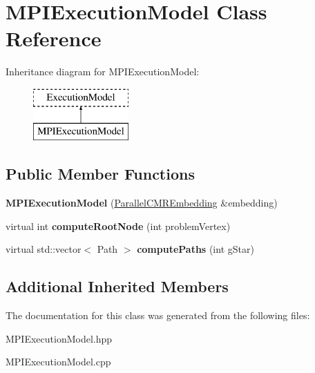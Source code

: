 \hypertarget{a00086}{}\section{M\+P\+I\+Execution\+Model Class Reference}
\label{a00086}
Inheritance diagram for M\+P\+I\+Execution\+Model\+:\begin{figure}[H]
\begin{center}
\leavevmode
\includegraphics[height=2.000000cm]{a00086}
\end{center}
\end{figure}
\subsection*{Public Member Functions}
\begin{DoxyCompactItemize}
\item 
{\bfseries M\+P\+I\+Execution\+Model} (\hyperlink{a00092}{Parallel\+C\+M\+R\+Embedding} \&embedding)\hypertarget{a00086_ab0e43099474e961b76936322b6733322}{}\label{a00086_ab0e43099474e961b76936322b6733322}

\item 
virtual int {\bfseries compute\+Root\+Node} (int problem\+Vertex)\hypertarget{a00086_a32469805d53aa6d9b32bce8514597810}{}\label{a00086_a32469805d53aa6d9b32bce8514597810}

\item 
virtual std\+::vector$<$ Path $>$ {\bfseries compute\+Paths} (int g\+Star)\hypertarget{a00086_ad3b1a2f6f182aa55a1a59ebc068d1a73}{}\label{a00086_ad3b1a2f6f182aa55a1a59ebc068d1a73}

\end{DoxyCompactItemize}
\subsection*{Additional Inherited Members}


The documentation for this class was generated from the following files\+:\begin{DoxyCompactItemize}
\item 
M\+P\+I\+Execution\+Model.\+hpp\item 
M\+P\+I\+Execution\+Model.\+cpp\end{DoxyCompactItemize}
